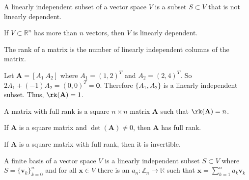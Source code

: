 \documentclass[crop=false,class=book,oneside]{standalone}
\begin{document}
            \begin{definition}
                A linearly independent subset of a vector space
                $V$ is a subset ${S}\subset{V}$ that is not
                linearly dependent.
            \end{definition}
            \begin{theorem*}
                If $V\subset\mathbb{R}^{n}$ has more than
                $n$ vectors, then $V$ is linearly dependent.
            \end{theorem*}
            \begin{definition}
                The rank of a matrix is the number
                of linearly independent columns of
                the matrix.
            \end{definition}
            \begin{example}
                Let
                $\mathbf{A}=[A_{1}\ A_{2}]$
                where $A_{1}=(1,2)^{T}$ and
                $A_{2}=(2,4)^{T}$. So
                $2A_{1}+(-1)A_{2}=(0,0)^{T}=\mathbf{0}$. Therefore
                $\{A_{1},A_{2}\}$ is a linearly independent
                subset. Thus, $\rk(\mathbf{A})=1$.
            \end{example}
            \begin{definition}
                A matrix with full rank is a square
                ${n}\times{n}$ matrix $\mathbf{A}$ such that
                $\rk(\mathbf{A})=n$.
            \end{definition}
            \begin{theorem*}
                If $\mathbf{A}$ is a square matrix and
                $\det(\mathbf{A})\ne{0}$, then $\mathbf{A}$
                has full rank.
            \end{theorem*}
            \begin{theorem*}
                If $\mathbf{A}$ is a square matrix
                with full rank, then it is invertible.
            \end{theorem*}
            \begin{definition}
                A finite basis of a vector space $V$ is a
                linearly independent subset ${S}\subset{V}$
                where
                $S=\{\mathbf{v}_{k}\}_{k=0}^{n}$
                and for all
                $\mathbf{x}\in{V}$ there is an
                $a_{n}:\mathbb{Z}_{n}\rightarrow\mathbb{R}$
                such that
                $\mathbf{x}=\sum_{k=1}^{n}a_{k}\mathbf{v}_{k}$
            \end{definition}
\end{document}
